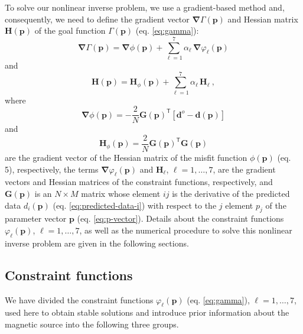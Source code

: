 To solve our nonlinear inverse problem, we use a gradient-based method and, consequently, we need to define the gradient vector $\boldsymbol{\nabla}\Gamma(\mathbf{p})$ and Hessian matrix $\mathbf{H}(\mathbf{p})$ of the goal function $\Gamma(\mathbf{p})$ (eq. \ref{eq:gamma}):
\begin{equation}\label{eq:gamma_gradient}
\boldsymbol{\nabla}\Gamma (\mathbf{p}) = \boldsymbol{\nabla}\phi (\mathbf{p}) + 
\sum\limits^{7}_{\ell =1} \alpha_{\ell} \, \boldsymbol{\nabla}\varphi_{\ell}(\mathbf{p})
\end{equation}
and
\begin{equation}\label{eq:gamma_hessian}
\mathbf{H} (\mathbf{p}) = \mathbf{H}_\phi (\mathbf{p}) + \sum\limits^{7}_{\ell =1} \alpha_{\ell} \, \mathbf{H}_\ell \: ,
\end{equation}
where 
\begin{equation}\label{eq:phi_gradient}
\boldsymbol{\nabla} \phi(\mathbf{p}) =  - \frac{2}{N}\mathbf{G}(\mathbf{p})^{\mathsf{T}}[\mathbf{d}^o - \mathbf{d}(\mathbf{p})]
\end{equation} 
and 
\begin{equation}\label{eq:phi_hessian}
\mathbf{H}_{\phi}(\mathbf{p}) = \frac{2}{N}\mathbf{G}(\mathbf{p})^{\mathsf{T}}\mathbf{G}(\mathbf{p})
\end{equation}
are the gradient vector of the Hessian matrix of the misfit function $\phi(\mathbf{p})$ (eq. 5), respectively, the terms  $\boldsymbol{\nabla} \varphi_{\ell}(\mathbf{p})$ and $\mathbf{H}_{\ell}$, $\ell = 1, \dots, 7$, are the gradient vectors and Hessian matrices of the constraint functions, respectively, and $\mathbf{G}(\mathbf{p})$ is an $N \times M$ matrix whose element $ij$ is the derivative of the predicted data $d_{i}(\mathbf{p})$ (eq. \ref{eq:predicted-data-i}) with respect to the $j$ element $p_{j}$ of 
the parameter vector $\mathbf{p}$ (eq. \ref{eq:p-vector}). Details about the constraint functions $\varphi_\ell(\mathbf{p})$, $\ell = 1, \dots, 7$, as well as the numerical procedure to solve this nonlinear inverse problem are given in the following sections.

\subsection{Constraint functions}\label{sec:constraints}

We have divided the constraint functions $\varphi_{\ell}(\mathbf{p})$ (eq. \ref{eq:gamma}), $\ell = 1, \dots, 7$, used here to obtain stable solutions and introduce prior information about the magnetic source into the following three groups.

